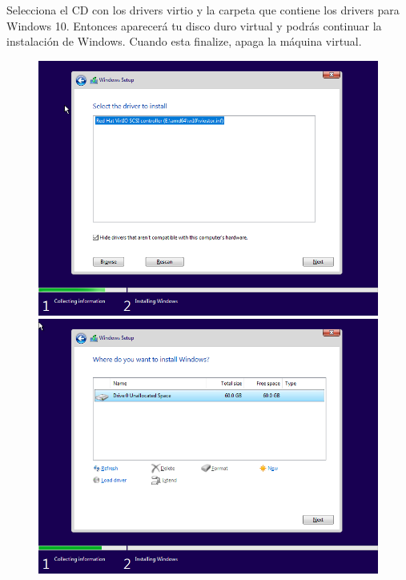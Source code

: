 \documentclass[12pt]{article}
\begin{document}
Selecciona el CD con los drivers virtio y la carpeta que contiene los drivers para Windows 10. Entonces aparecerá tu disco duro virtual y podrás continuar la instalación de Windows. Cuando esta finalize, apaga la máquina virtual.

\begin{figure}[h]
\centering
\begin{minipage}[b]{0.4\textwidth}
\includegraphics[width=\textwidth]{images/windows-setup-03.png}
\end{minipage}
\hspace{10pt}
\begin{minipage}[b]{0.4\textwidth}
\includegraphics[width=\textwidth]{images/windows-setup-04.png}
\end{minipage}
\end{figure}
\end{document}

